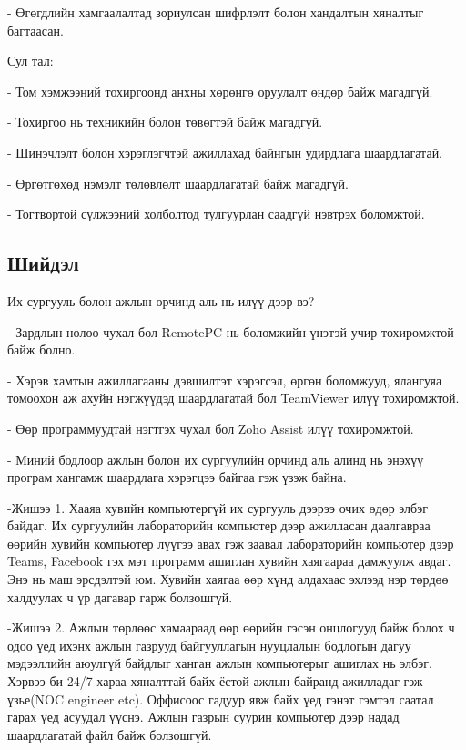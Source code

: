 - Өгөгдлийн хамгаалалтад зориулсан шифрлэлт болон хандалтын хяналтыг багтаасан.

Сул тал:

- Том хэмжээний тохиргоонд анхны хөрөнгө оруулалт өндөр байж магадгүй.

- Тохиргоо нь техникийн болон төвөгтэй байж магадгүй.

- Шинэчлэлт болон хэрэглэгчтэй ажиллахад байнгын удирдлага шаардлагатай.

- Өргөтгөхөд нэмэлт төлөвлөлт шаардлагатай байж магадгүй.

- Тогтвортой сүлжээний холболтод тулгуурлан саадгүй нэвтрэх боломжтой.
	\pagebreak	

\subsection{Шийдэл}
	\quad \quad 
	Их сургууль болон ажлын орчинд аль нь илүү дээр вэ?

- Зардлын нөлөө чухал бол RemotePC нь боломжийн үнэтэй учир тохиромжтой байж болно.

- Хэрэв хамтын ажиллагааны дэвшилтэт хэрэгсэл, өргөн боломжууд, ялангуяа томоохон аж ахуйн нэгжүүдэд шаардлагатай бол TeamViewer илүү тохиромжтой.

- Өөр программуудтай нэгтгэх чухал бол Zoho Assist илүү тохиромжтой.

- Миний бодлоор ажлын болон их сургуулийн орчинд аль алинд нь энэхүү програм хангамж шаардлага хэрэгцээ байгаа гэж үзэж байна.

-Жишээ 1. Хааяа хувийн компьютергүй их сургууль дээрээ очих өдөр элбэг байдаг. Их сургуулийн лабораторийн компьютер дээр ажилласан даалгавраа өөрийн хувийн компьютер лүүгээ авах гэж заавал лабораторийн компьютер дээр Teams, Facebook гэх мэт программ ашиглан хувийн хаягаараа дамжуулж авдаг. Энэ нь маш эрсдэлтэй юм. Хувийн хаягаа өөр хүнд алдахаас эхлээд нэр төрдөө халдуулах ч үр дагавар гарж болзошгүй.

-Жишээ 2. Ажлын төрлөөс хамаараад өөр өөрийн гэсэн онцлогууд байж болох ч одоо үед ихэнх ажлын газрууд байгууллагын нууцлалын бодлогын дагуу мэдээллийн аюулгүй байдлыг ханган ажлын компьютерыг ашиглах нь элбэг. Хэрвээ би 24/7 хараа хяналттай байх ёстой ажлын байранд ажилладаг гэж үзье(NOC engineer etc). Оффисоос гадуур явж байх үед гэнэт гэмтэл саатал гарах үед асуудал үүснэ. Ажлын газрын суурин компьютер дээр надад шаардлагатай файл байж болзошгүй.
	\pagebreak	   